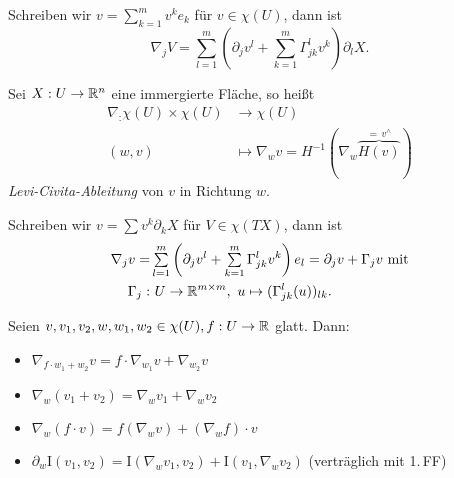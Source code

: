 \documentclass{cheat-sheet}
\newcommand{\I}{\mathrm{I}}
\begin{document}
\begin{bem}
  Schreiben wir $v = \sum_{k=1}^m v^k e_k$ für $v \in \chi(U)$, dann ist
  \[ \nabla_j V = \sum_{l=1}^m \left( \partial_j v^l + \sum_{k=1}^m \Gamma_{jk}^l v^k \right) \partial_l X. \]
\end{bem}



\begin{definition}
  Sei $X : U \to \mathbb{R}^n$ eine immergierte Fläche, so heißt
  \begin{align*}
    \nabla_ : \chi(U) \times \chi(U) &\to \chi(U) \\[-12pt]
    (w, v) &\mapsto \nabla_w v = H^{-1}(\nabla_w \overbrace{H(v)}^{=\,v^\wedge})
  \end{align*}
  \emph{Levi-Civita-Ableitung} von $v$ in Richtung $w$.
\end{definition}

\begin{bem}
  Schreiben wir $v = \sum v^k \partial_k X$ für $V \in \chi(TX)$, dann ist
  \begin{align*}
    \nabla_j v =& \sum_{l=1}^m \left( \partial_j v^l + \sum_{k=1}^m \Gamma_{jk}^l v^k \right) e_l = \partial_j v + \Gamma_j v \text{ mit}\\
    \Gamma_j :& \,\, U \to \R^{m \times m}, \,\, u \mapsto (\Gamma_{jk}^l(u))_{lk}.
  \end{align*}
\end{bem}

\begin{satz}
  Seien $v, v_1, v_2, w, w_1, w_2 \in \chi(U), f : U \to \mathbb{R}$ glatt. Dann:
  \begin{itemize}
    \item $\nabla_{f \cdot w_1 + w_2} v = f \cdot \nabla_{w_1} v + \nabla_{w_2} v$
    \item $\nabla_w (v_1 + v_2) = \nabla_w v_1 + \nabla_w v_2$
    \item $\nabla_w (f \cdot v) = f (\nabla_w v) + (\nabla_w f) \cdot v$
    \item $\partial_w \I(v_1, v_2) = \I(\nabla_w v_1, v_2) + \I(v_1, \nabla_w v_2)$ (verträglich mit 1.\,FF)
  \end{itemize}
\end{satz}
\end{document}
